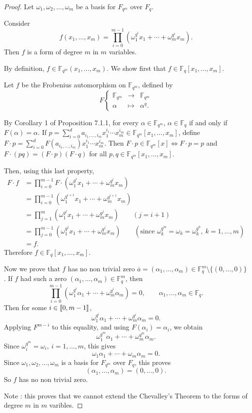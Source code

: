 \documentclass[11pt,a4paper]{article}
\def\gcro{\mbox{[\hspace{-.15em}[}}%
\def\dcro{\mbox{]\hspace{-.15em}]}}
\newcommand{\F}{\mathbb{F}}
\begin{document}
\begin{proof}
Let $\omega_1,\omega_2,\ldots,\omega_m$ be a basis for $F_{q^m}$ over $F_q$.

Consider $$f(x_1,\ldots,x_m) = \prod_{i=0}^{m-1} (\omega_1^{q^i} x_1 + \cdots + \omega_m^{q^i} x_m).$$
Then $f$ is a form of degree $m$ in $m$ variables.

By definition, $f \in \F_{q^m}(x_1,\ldots,x_m)$. We show first that $f \in \F_q[x_1,\ldots,x_m]$.

Let $f$ be the Frobenius automorphism on $\F_{q^m}$, defined by
$$F
\left\{
\begin{array}{ccl}
\F_{q^m} & \to &\F_{q^m}\\
\alpha & \mapsto & \alpha^q.
\end{array}
\right.
$$

By Corollary 1 of Proposition 7.1.1, for every $\alpha \in \F_{q^m}$, $\alpha \in \F_q$ if and only if $F(\alpha) = \alpha$. If $p = \sum_{i=0}^d a_{i_1,\ldots,i_m}  x_1^{i_1} \cdots x_m^{i_m} \in \F_{q^m}[x_1,\ldots,x_m]$, define $F\cdot p =\sum_{i=0}^d F(a_{i_1,\ldots,i_m})  x_1^{i_1} \cdots x_m^{i_m} $. Then $F \cdot p \in \F_{q^m}[x] \iff F \cdot p = p$ and $F\cdot (pq) = (F\cdot p)(F \cdot q)$ for all $p,q \in  \F_{q^m}[x_1,\ldots,x_m]$.

Then, using this last property, 
\begin{align*}
F \cdot f &= \prod_{i=0}^{m-1} F \cdot (\omega_1^{q^i} x_1 + \cdots + \omega_m^{q^i} x_m)\\
&=\prod_{i=0}^{m-1} (\omega_1^{q^{i+1}} x_1 + \cdots + \omega_m^{q^{i+1}} x_m)\\
&=\prod_{j=1}^{m} (\omega_1^{q^j} x_1 + \cdots + \omega_m^{q^j} x_m) \qquad (j=i+1)\\
&=\prod_{j=0}^{m-1} (\omega_1^{q^j} x_1 + \cdots + \omega_m^{q^j} x_m) \qquad (\text{since } \omega_k^{q^m} = \omega_k = \omega_k^{q^0},\ k=1,\ldots,m)\\
&= f.
\end{align*}
Therefore $f \in \F_q[x_1,\ldots,x_m]$.

Now we prove that $f$ has no non trivial zero $\overline{a} = (\alpha_1,\ldots,\alpha_m) \in \F_q^m \setminus \{(0,\ldots,0)\}$. If $f$ had such a zero $(\alpha_1,\ldots,\alpha_m) \in \F_q^m$, then 
$$\prod_{i=0}^{m-1} (\omega_1^{q^i} \alpha_1 + \cdots + \omega_m^{q^i} \alpha_m) = 0,\qquad \alpha_1,\ldots,\alpha_m \in \F_q.$$
Then for some $i \in \gcro 0,m-1 \dcro$,
$$\omega_1^{q^i} \alpha_1 + \cdots + \omega_m^{q^i} \alpha_m = 0.$$
Applying $F^{m-i}$ to this equality, and using $F(\alpha_i) = \alpha_i$, we obtain
$$\omega_1^{q^m} \alpha_1 + \cdots + \omega_m^{q^m} \alpha_m.$$
Since $\omega_i^{q^m} = \omega_i,\ i = 1,\ldots,m$, this gives
$$\omega_1 \alpha_1 + \cdots + \omega_m \alpha_m = 0.$$
Since $\omega_1,\omega_2,\ldots,\omega_m$ is a basis for $F_{q^m}$ over $F_q$, this proves
$$(\alpha_1,\ldots,\alpha_m) = (0,\ldots,0).$$
So $f$ has no non trivial zero.

Note : this proves that we cannot extend the Chevalley's Theorem to the forms of degree $m$ in $m$ varibles.
\end{proof}
\end{document}
